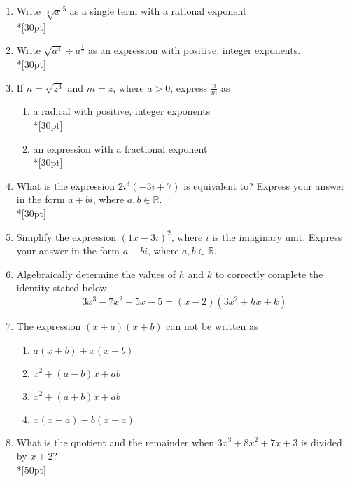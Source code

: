 \documentclass[12pt, oneside]{article}
\begin{document}
\begin{enumerate}
\newpage


\item Write $\sqrt[3]x^5$ as a single term with a rational exponent.\\*[30pt]

\item Write $\sqrt{a^4} \div a^{\frac{1}{2}}$ as an expression with positive, integer exponents.\\*[30pt]

\item If $n=\sqrt{z^3}$ and $m=z$, where $a > 0$, express $\frac{n}{m}$ as 
\begin{enumerate}
    \item a radical with positive, integer exponents\\*[30pt]
    \item an expression with a fractional exponent\\*[30pt]
\end{enumerate}

\item What is the expression $2i^3(-3i+7)$ is equivalent to? Express your answer in the form $a+bi$, where $a, b \in \mathbb{R}$.\\*[30pt]  %

\item Simplify the expression $(1x - 3i)^2$, where $i$ is the imaginary unit. Express your answer in the form $a+bi$, where $a, b \in \mathbb{R}$.\\[30pt] %

\item Algebraically determine the values of $h$ and $k$ to correctly complete the identity stated below.
\[3x^3-7x^2+5x-5=(x-2)(3x^2+hx+k)\] %

\newpage
\item The expression $(x + a)(x + b)$ can not be written as
\begin{enumerate}
    \item $a(x + b)+ x(x + b)$
    \item $x^2 + (a - b)x + ab$ 
    \item  $x^2 + (a + b)x + ab$  
    \item $x(x + a)+ b(x + a)$
\end{enumerate}

\item What is the quotient and the remainder when $3x^3+8x^2+7x+3$ is divided by $x+2$?\\*[50pt]


\end{enumerate}
\end{document}
